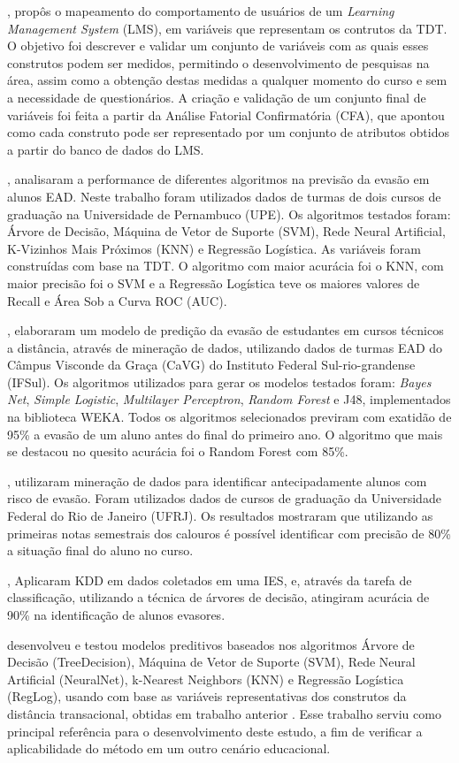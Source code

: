 , propôs o mapeamento do comportamento de
usuários de um \textit{Learning Management System} (LMS), em variáveis que
representam os contrutos da TDT. O objetivo foi descrever e validar um conjunto
de variáveis com as quais esses construtos podem ser medidos, permitindo o
desenvolvimento de pesquisas na área, assim como a obtenção destas medidas a
qualquer momento do curso e sem a necessidade de questionários. A criação e
validação de um conjunto final de variáveis foi feita a partir da Análise
Fatorial Confirmatória (CFA), que apontou como cada construto pode ser
representado por um conjunto de atributos obtidos a partir do banco de dados do
LMS.

, analisaram a performance de diferentes algoritmos
na previsão da evasão em alunos EAD. Neste trabalho foram utilizados dados de
turmas de dois cursos de graduação na Universidade de Pernambuco (UPE). Os
algoritmos testados foram: Árvore de Decisão, Máquina de Vetor de Suporte
(SVM), Rede Neural Artificial, K-Vizinhos Mais Próximos (KNN) e Regressão
Logística. As variáveis foram construídas com base na TDT. O algoritmo com maior
acurácia foi o KNN, com maior precisão foi o SVM e a Regressão Logística teve os
maiores valores de Recall e Área Sob a Curva ROC (AUC).

, elaboraram um modelo de predição da evasão de
estudantes em cursos técnicos a distância, através de mineração de dados,
utilizando dados de turmas EAD do Câmpus Visconde da Graça (CaVG) do Instituto
Federal Sul-rio-grandense (IFSul). Os algoritmos utilizados para gerar os
modelos testados foram: \textit{Bayes Net}, \textit{Simple Logistic},
\textit{Multilayer Perceptron}, \textit{Random Forest} e J48, implementados na
biblioteca WEKA. Todos os algoritmos selecionados previram com exatidão de 95\%
a evasão de um aluno antes do final do primeiro ano. O algoritmo que mais se
destacou no quesito acurácia foi o Random Forest com 85\%.

, utilizaram mineração de dados para identificar
antecipadamente alunos com risco de evasão. Foram utilizados dados de cursos de
graduação da Universidade Federal do Rio de Janeiro (UFRJ). Os resultados
mostraram que utilizando as primeiras notas semestrais dos calouros é possível
identificar com precisão de 80\% a situação final do aluno no curso.

, Aplicaram KDD em dados coletados em uma IES,
e, através da tarefa de classificação, utilizando a técnica de árvores de
decisão, atingiram acurácia de 90\% na identificação de alunos evasores.

 desenvolveu e testou modelos preditivos baseados
nos algoritmos Árvore de Decisão (TreeDecision), Máquina de Vetor de Suporte
(SVM), Rede Neural Artificial (NeuralNet), k-Nearest Neighbors (KNN) e Regressão
Logística (RegLog), usando com base as variáveis representativas dos construtos
da distância transacional, obtidas em trabalho anterior
\cite{ramos2016mapeamento}. Esse trabalho serviu como principal referência para
o desenvolvimento deste estudo, a fim de verificar a aplicabilidade do método em
um outro cenário educacional.